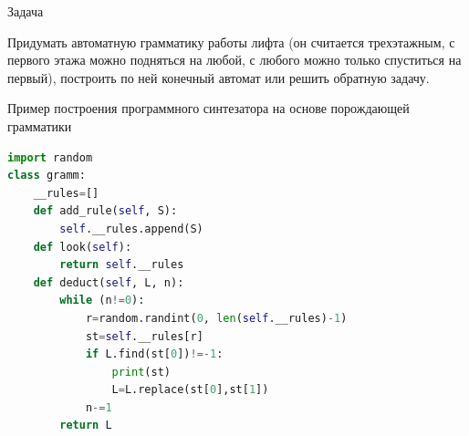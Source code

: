 \documentclass[12pt, pdf, hyperref={unicode},handout]{beamer}
\begin{document}
\begin{frame}{Задача}
  \begin{block}

    \small{
      Придумать автоматную грамматику работы лифта (он считается трехэтажным, с первого этажа можно подняться на любой, с любого можно только спуститься на  первый), построить по ней конечный автомат или решить обратную задачу.
        }

  \end{block}
  
\end{frame}


\begin{frame}[fragile]{Пример построения программного синтезатора на основе порождающей грамматики}
 
\begin{lstlisting}[language=python]
import random
class gramm:
    __rules=[]
    def add_rule(self, S):
        self.__rules.append(S)
    def look(self):
        return self.__rules
    def deduct(self, L, n):
        while (n!=0):
            r=random.randint(0, len(self.__rules)-1)
            st=self.__rules[r]
            if L.find(st[0])!=-1:
                print(st)
                L=L.replace(st[0],st[1])
            n-=1
        return L
    \end{lstlisting}

  \end{frame}
 
\end{document}
